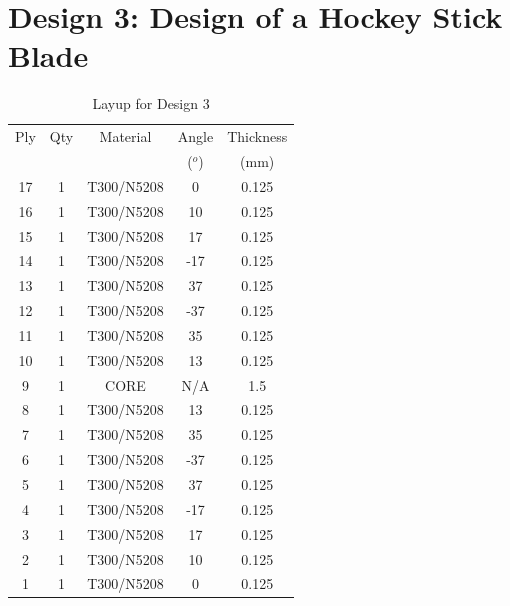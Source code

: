 \documentclass{SelimArticle}
\begin{document}
\section{Design 3: Design of a Hockey Stick Blade}
\begin{table}[H]
\centering
\caption{Layup for Design 3}
\label{tab:q3finallayup}
\begin{tabular}{|c|c|c|c|c|}
\hline
Ply & Qty             & Material           & Angle & Thickness \\
& & & ($^{o}$) & (mm) \\
\hline
        17 &          1 & T300/N5208 &          0 &      0.125 \\

        16 &          1 & T300/N5208 &         10 &      0.125 \\

        15 &          1 & T300/N5208 &         17 &      0.125 \\

        14 &          1 & T300/N5208 &        -17 &      0.125 \\

        13 &          1 & T300/N5208 &         37 &      0.125 \\

        12 &          1 & T300/N5208 &        -37 &      0.125 \\

        11 &          1 & T300/N5208 &         35 &      0.125 \\

        10 &          1 & T300/N5208 &         13 &      0.125 \\

         9 &          1 &       CORE &        N/A &        1.5 \\

         8 &          1 & T300/N5208 &         13 &      0.125 \\

         7 &          1 & T300/N5208 &         35 &      0.125 \\

         6 &          1 & T300/N5208 &        -37 &      0.125 \\

         5 &          1 & T300/N5208 &         37 &      0.125 \\

         4 &          1 & T300/N5208 &        -17 &      0.125 \\

         3 &          1 & T300/N5208 &         17 &      0.125 \\

         2 &          1 & T300/N5208 &         10 &      0.125 \\

         1 &          1 & T300/N5208 &          0 &      0.125 \\
\hline
\end{tabular}  
\end{table}
\end{document}
